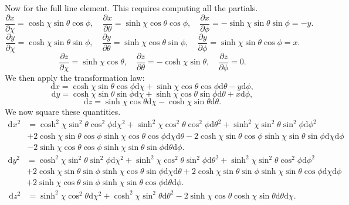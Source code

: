 \documentclass[11pt, letterpaper]{article}
\theoremstyle{plain}
\begin{document}
Now for the full line element. This requires computing all the partials.
\[
	\frac{\partial x}{\partial \chi } =\cosh\chi \sin \theta \cos \phi ,\quad \frac{\partial x}{\partial \theta } =\sinh\chi \cos \theta \cos \phi ,\quad \frac{\partial x}{\partial \phi } =-\sinh\chi \sin \theta \sin \phi =-y
.\]
\[
	\frac{\partial y}{\partial \chi }=\cosh\chi \sin \theta \sin \phi ,\quad \frac{\partial y}{\partial \theta } =\sinh\chi \cos \theta \sin \phi ,\quad \frac{\partial y}{\partial \phi } =\sinh\chi \sin \theta \cos \phi =x
.\]
\[
	\frac{\partial z}{\partial \chi } =\sinh\chi \cos \theta ,\quad \frac{\partial z}{\partial \theta } =-\cosh\chi \sin \theta ,\quad \frac{\partial z}{\partial \phi } =0
.\]
We then apply the transformation law:
\[
	\mathrm{d} x=\cosh\chi \sin \theta \cos \phi \mathrm{d} \chi +\sinh\chi \cos \theta \cos \phi \mathrm{d} \theta -y\mathrm{d} \phi ,
\]
\[
	\mathrm{d} y=\cosh\chi \sin \theta \sin \phi \mathrm{d} \chi +\sinh\chi \cos \theta \sin \phi \mathrm{d} \theta +x\mathrm{d} \phi ,
\]
\[
	\mathrm{d} z=\sinh\chi \cos \theta \mathrm{d} \chi -\cosh\chi \sin \theta \mathrm{d} \theta 
.\]
We now square these quantities.
\begin{align*}
	\mathrm{d} x^2&=\cosh^2\chi \sin ^2\theta \cos ^2\phi \mathrm{d} \chi ^2+\sinh^2\chi \cos ^2\theta \cos ^2\phi \mathrm{d} \theta ^2+\sinh^2\chi \sin ^2\theta \sin ^2\phi \mathrm{d} \phi ^2\\
		      &+2\cosh\chi \sin \theta \cos \phi \sinh \chi \cos \theta \cos \phi \mathrm{d} \chi \mathrm{d} \theta -2 \cosh \chi \sin \theta \cos \phi \sinh\chi \sin \theta \sin \phi \mathrm{d} \chi  \mathrm{d} \phi \\
		      &-2 \sinh\chi \cos \theta \cos \phi \sinh\chi \sin \theta \sin \phi \mathrm{d} \theta \mathrm{d} \phi 
.\end{align*}
\begin{align*}
	\mathrm{d} y^2&=\cosh^2\chi \sin ^2\theta \sin ^2\phi \mathrm{d} \chi ^2+\sinh^2\chi \cos ^2\theta \sin ^2\phi \mathrm{d} \theta ^2+\sinh^2\chi \sin ^2\theta \cos ^2\phi \mathrm{d} \phi^2 \\
	&+2 \cosh\chi \sin \theta \sin \phi \sinh\chi \cos \theta \sin \phi \mathrm{d} \chi \mathrm{d} \theta +2 \cosh\chi \sin \theta \sin \phi \sinh\chi \sin \theta \cos \phi \mathrm{d} \chi \mathrm{d} \phi \\
	&+2 \sinh\chi \cos \theta \sin \phi \sinh\chi \sin \theta \cos \phi \mathrm{d} \theta \mathrm{d} \phi 
.\end{align*}
\begin{align*}
	\mathrm{d} z^2&= \sinh^2\chi \cos ^2\theta \mathrm{d} \chi ^2+\cosh^2\chi \sin ^2\theta \mathrm{d} \theta ^2-2 \sinh\chi \cos \theta \cosh\chi \sin \theta \mathrm{d} \theta \mathrm{d} \chi 
.\end{align*}
\end{document}
